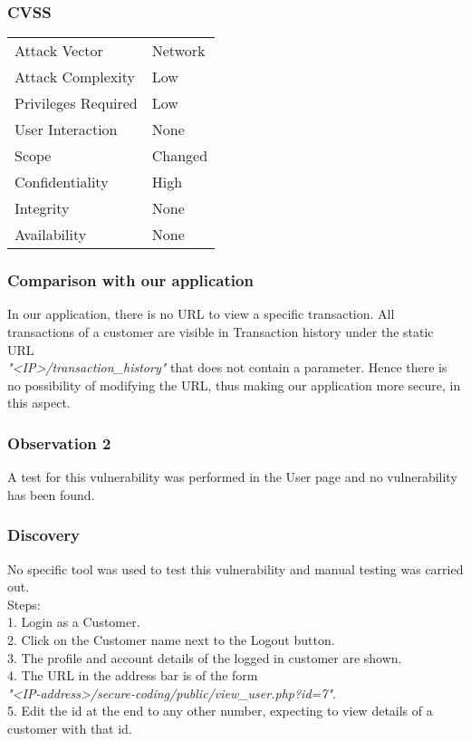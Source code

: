 \subsubsection{CVSS}
\begin{tabular}{l | l}
Attack Vector		& Network \\
Attack Complexity	& Low \\
Privileges Required & Low \\
User Interaction	& None \\
Scope				& Changed \\
Confidentiality		& High \\
Integrity			& None \\
Availability		& None
\end{tabular}

\subsubsection{Comparison with our application}
In our application, there is no URL to view a specific transaction. All transactions of a customer are visible in Transaction history under the static URL \\ 
\textit{"<IP>/transaction\_history"} that does not contain a parameter. Hence there is no possibility of modifying the URL, thus making our application more secure, in this aspect.
\clearpage

\subsubsection{Observation 2}
A test for this vulnerability was performed in the User page and no vulnerability has been found.

\subsubsection{Discovery}
No specific tool was used to test this vulnerability and manual testing was carried out.\\
Steps: \\
1. Login as a Customer. \\
2. Click on the Customer name next to the Logout button. \\
3. The profile and account details of the logged in customer are shown. \\
4. The URL in the address bar is of the form \\ \textit{"<IP-address>/secure-coding/public/view\_user.php?id=7"}. \\
5. Edit the id at the end to any other number, expecting to view details of a customer with that id. \\

